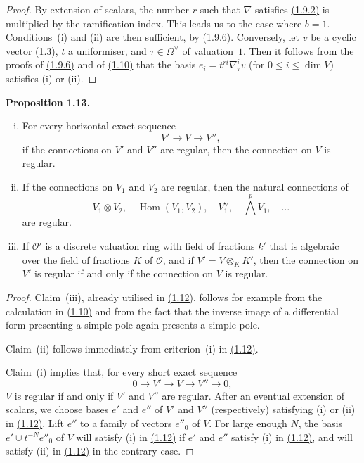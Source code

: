 \documentclass{report}
\newenvironment{itenv}[1]
  {\phantomsection\par\medskip\noindent\textbf{#1.}\itshape}
  {\medskip}
\renewcommand{\cal}[1]{{\mathcal{#1}}}
\renewcommand{\leq}{\leqslant}
\DeclareMathOperator{\Hom}{Hom}
\newcommand{\oldpage}[1]{\marginpar{\footnotesize$\Big\vert$ \textit{p.~#1}}}
\begin{document}
\begin{proof}
  By extension of scalars, the number $r$ such that $\nabla$ satisfies \hyperref[II.1.9.2]{(1.9.2)} is multiplied by the ramification index.
  This leads us to the case where $b=1$.
  Conditions~(i) and (ii) are then sufficient, by \hyperref[II.1.9.6]{(1.9.6)}.
  Conversely, let $v$ be a cyclic vector \hyperref[II.1.3]{(1.3)}, $t$ a uniformiser, and $\tau\in\Omega^\vee$ of valuation~$1$.
  Then it follows from the proofs of \hyperref[II.1.9.6]{(1.9.6)} and of \hyperref[II.1.10]{(1.10)} that the basis $e_i=t^{ri}\nabla_\tau^i v$ (for $0\leq i\leq\dim V$) satisfies (i) or (ii).
\end{proof}

\begin{itenv}{Proposition 1.13}
\label{II.1.13}
  \begin{enumerate}[(i)]
    \item For every horizontal exact sequence
      \[
        V' \to V \to V'',
      \]
      if the connections on $V'$ and $V''$ are regular, then the connection on $V$ is regular.
    \item If the connections on $V_1$ and $V_2$ are regular, then the natural connections of
      \[
        V_1\otimes V_2,
        \quad \Hom(V_1,V_2),
        \quad V_1^\vee,
        \quad \bigwedge^p V_1,
        \quad \ldots
      \]
      are regular.
    \item If $\cal{O}'$ is a discrete valuation ring with field of fractions $k'$ that is algebraic over the field of fractions $K$ of $\cal{O}$, and if $V'=V\otimes_K K'$, then the connection on $V'$ is regular if and only if the connection on $V$ is regular.
  \end{enumerate}
\end{itenv}

\begin{proof}
  Claim~(iii), already utilised in \hyperref[II.1.12]{(1.12)}, follows for example from the calculation in \hyperref[II.1.10]{(1.10)} and from the fact that the inverse image of a differential form presenting a simple pole again presents a simple pole.

\oldpage{52}
  Claim~(ii) follows immediately from criterion~(i) in \hyperref[II.1.12]{(1.12)}.

  Claim~(i) implies that, for every short exact sequence
  \[
    0 \to V' \to V \to V'' \to 0,
  \]
  $V$ is regular if and only if $V'$ and $V''$ are regular.
  After an eventual extension of scalars, we choose bases $e'$ and $e''$ of $V'$ and $V''$ (respectively) satisfying (i) or (ii) in \hyperref[II.1.12]{(1.12)}.
  Lift $e''$ to a family of vectors $e''_0$ of $V$.
  For large enough $N$, the basis $e'\cup t^{-N}e''_0$ of $V$ will satisfy (i) in \hyperref[II.1.12]{(1.12)} if $e'$ and $e''$ satisfy (i) in \hyperref[II.1.12]{(1.12)}, and will satisfy (ii) in \hyperref[II.1.12]{(1.12)} in the contrary case.
\end{proof}
\end{document}
